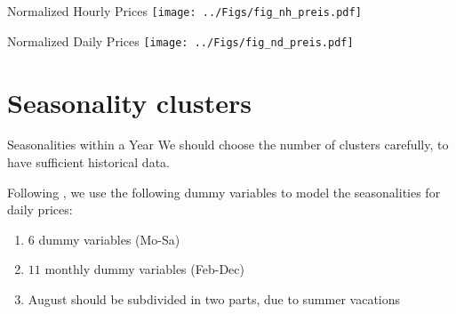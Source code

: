 \documentclass{beamer}
\begin{document}
\begin{frame}{Normalized Hourly Prices}
    \texttt{[image: ../Figs/fig\_nh\_preis.pdf]}
\end{frame}


\begin{frame}{Normalized Daily Prices}
    \texttt{[image: ../Figs/fig\_nd\_preis.pdf]}
\end{frame}







\section{Seasonality clusters}

\begin{frame}{Seasonalities within a Year}
    We should choose the number of clusters carefully, to have sufficient historical data.

    Following \cite{SteinErikParaschivSchuerle-2013}, we use the following dummy variables to model the seasonalities for daily prices:
    \begin{enumerate}[label=--]
        \item $6$ dummy variables (Mo-Sa)

        \item $11$ monthly dummy variables (Feb-Dec)

        \item August should be subdivided in two parts, due to summer vacations
    \end{enumerate}
\end{frame}
\end{document}
